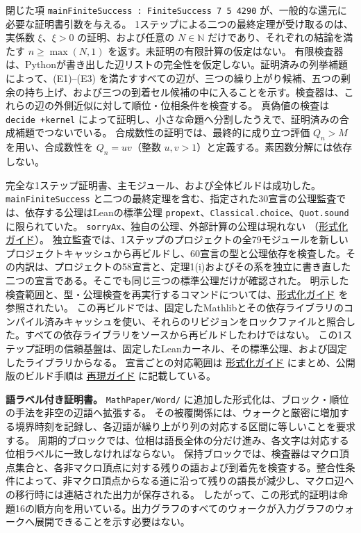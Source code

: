 \documentclass[11pt,reqno]{amsart}
\theoremstyle{definition}
\theoremstyle{definition}
\theoremstyle{remark}
\begin{document}
閉じた項 \texttt{mainFiniteSuccess\ :\ FiniteSuccess\ 7\ 5\ 4290} が、一般的な還元に必要な証明書引数を与える。
1ステップによる二つの最終定理が受け取るのは、実係数 \(\xi\)、\(\xi>0\) の証明、および任意の \(N\in\mathbb N\) だけであり、それぞれの結論を満たす \(n\ge\max(N,1)\) を返す。未証明の有限計算の仮定はない。
有限検査器は、Pythonが書き出した辺リストの完全性を仮定しない。証明済みの列挙補題によって、(E1)--(E3) を満たすすべての辺が、三つの繰り上がり候補、五つの剰余の持ち上げ、および三つの到着セル候補の中に入ることを示す。検査器は、これらの辺の外側近似に対して順位・位相条件を検査する。
真偽値の検査は \texttt{decide\ +kernel} によって証明し、小さな命題へ分割したうえで、証明済みの合成補題でつないでいる。
合成数性の証明では、最終的に成り立つ評価 \(Q_n>M\) を用い、合成数性を \(Q_n=uv\)（整数 \(u,v>1\)）と定義する。素因数分解には依存しない。

完全な1ステップ証明書、主モジュール、および全体ビルドは成功した。
\texttt{mainFiniteSuccess} と二つの最終定理を含む、指定された30宣言の公理監査では、依存する公理はLeanの標準公理 \texttt{propext}、\texttt{Classical.choice}、\texttt{Quot.sound} に限られていた。
\texttt{sorryAx}、独自の公理、外部計算の公理は現れない
（\href{supplement/FORMALIZATION.md}{形式化ガイド}）。
独立監査では、1ステップのプロジェクトの全79モジュールを新しいプロジェクトキャッシュから再ビルドし、60宣言の型と公理依存を検査した。その内訳は、プロジェクトの58宣言と、定理1(i)およびその系を独立に書き直した二つの宣言である。そこでも同じ三つの標準公理だけが確認された。
明示した検査範囲と、型・公理検査を再実行するコマンドについては、\href{supplement/FORMALIZATION.md}{形式化ガイド} を参照されたい。
この再ビルドでは、固定したMathlibとその依存ライブラリのコンパイル済みキャッシュを使い、それらのリビジョンをロックファイルと照合した。すべての依存ライブラリをソースから再ビルドしたわけではない。
この1ステップ証明の信頼基盤は、固定したLeanカーネル、その標準公理、および固定したライブラリからなる。
宣言ごとの対応範囲は \href{supplement/FORMALIZATION.md}{形式化ガイド} にまとめ、公開版のビルド手順は \href{REPRODUCE.md}{再現ガイド} に記載している。

\textbf{語ラベル付き証明書。} \nolinkurl{MathPaper/Word/} に追加した形式化は、ブロック・順位の手法を非空の辺語へ拡張する。
その被覆関係には、ウォークと厳密に増加する境界時刻を記録し、各辺語が繰り上がり列の対応する区間に等しいことを要求する。
周期的ブロックでは、位相は語長全体の分だけ進み、各文字は対応する位相ラベルに一致しなければならない。
保持ブロックでは、検査器はマクロ頂点集合と、各非マクロ頂点に対する残りの語および到着先を検査する。整合性条件によって、非マクロ頂点からなる道に沿って残りの語長が減少し、マクロ辺への移行時には連結された出力が保存される。
したがって、この形式的証明は命題16の順方向を用いている。出力グラフのすべてのウォークが入力グラフのウォークへ展開できることを示す必要はない。
\end{document}
